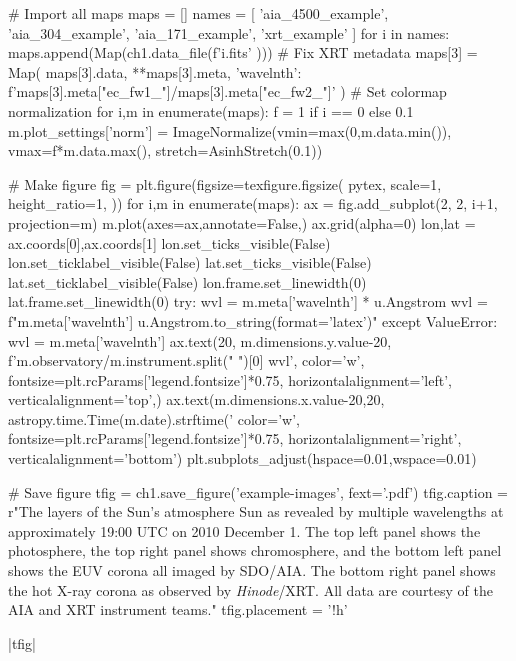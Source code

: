 \begin{pycode}[chapter1]
# Import all maps
maps = []
names = [
    'aia_4500_example',
    'aia_304_example',
    'aia_171_example',
    'xrt_example'
]
for i in names:
    maps.append(Map(ch1.data_file(f'{i}.fits' )))
# Fix XRT metadata
maps[3] = Map(
    maps[3].data,
    {**maps[3].meta, 'wavelnth': f'{maps[3].meta["ec_fw1_"]}/{maps[3].meta["ec_fw2_"]}'}
)
# Set colormap normalization
for i,m in enumerate(maps):
    f = 1 if i == 0 else 0.1
    m.plot_settings['norm'] = ImageNormalize(vmin=max(0,m.data.min()),
                                             vmax=f*m.data.max(),
                                             stretch=AsinhStretch(0.1))

# Make figure
fig = plt.figure(figsize=texfigure.figsize(
    pytex,
    scale=1,
    height_ratio=1,
))
for i,m in enumerate(maps):
    ax = fig.add_subplot(2, 2, i+1, projection=m)
    m.plot(axes=ax,annotate=False,)
    ax.grid(alpha=0)
    lon,lat = ax.coords[0],ax.coords[1]
    lon.set_ticks_visible(False)
    lon.set_ticklabel_visible(False)
    lat.set_ticks_visible(False)
    lat.set_ticklabel_visible(False)
    lon.frame.set_linewidth(0)
    lat.frame.set_linewidth(0)
    try:
        wvl = m.meta['wavelnth'] * u.Angstrom
        wvl = f"{m.meta['wavelnth']} {u.Angstrom.to_string(format='latex')}"
    except ValueError:
        wvl = m.meta['wavelnth']
    ax.text(20, m.dimensions.y.value-20,
            f'{m.observatory}/{m.instrument.split(" ")[0]} {wvl}',
            color='w',
            fontsize=plt.rcParams['legend.fontsize']*0.75,
            horizontalalignment='left',
            verticalalignment='top',)
    ax.text(m.dimensions.x.value-20,20,
            astropy.time.Time(m.date).strftime('%
            color='w',
            fontsize=plt.rcParams['legend.fontsize']*0.75,
            horizontalalignment='right',
            verticalalignment='bottom')
plt.subplots_adjust(hspace=0.01,wspace=0.01)

# Save figure
tfig = ch1.save_figure('example-images', fext='.pdf')
tfig.caption = r"The layers of the Sun's atmosphere Sun as revealed by multiple wavelengths at approximately 19:00 UTC on 2010 December 1. The top left panel shows the photosphere, the top right panel shows chromosphere, and the bottom left panel shows the EUV corona all imaged by SDO/AIA. The bottom right panel shows the hot X-ray corona as observed by \textit{Hinode}/XRT. All data are courtesy of the AIA and XRT instrument teams."
tfig.placement = '!h'
\end{pycode}
\py[chapter1]|tfig|

